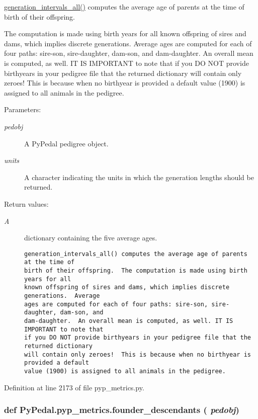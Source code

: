 \hyperlink{namespacePyPedal_1_1pyp__metrics_553d55d2e917b00baf2f02a7cceacd70}{generation\_\-intervals\_\-all()} computes the average age of parents at the time of birth of their offspring. 

The computation is made using birth years for all known offspring of sires and dams, which implies discrete generations. Average ages are computed for each of four paths: sire-son, sire-daughter, dam-son, and dam-daughter. An overall mean is computed, as well. IT IS IMPORTANT to note that if you DO NOT provide birthyears in your pedigree file that the returned dictionary will contain only zeroes! This is because when no birthyear is provided a default value (1900) is assigned to all animals in the pedigree. \begin{Desc}
\item[Parameters:]
\begin{description}
\item[{\em pedobj}]A Py\-Pedal pedigree object. \item[{\em units}]A character indicating the units in which the generation lengths should be returned. \end{description}
\end{Desc}
\begin{Desc}
\item[Return values:]
\begin{description}
\item[{\em A}]dictionary containing the five average ages.

\footnotesize\begin{verbatim}generation_intervals_all() computes the average age of parents at the time of
birth of their offspring.  The computation is made using birth years for all
known offspring of sires and dams, which implies discrete generations.  Average
ages are computed for each of four paths: sire-son, sire-daughter, dam-son, and
dam-daughter.  An overall mean is computed, as well. IT IS IMPORTANT to note that
if you DO NOT provide birthyears in your pedigree file that the returned dictionary
will contain only zeroes!  This is because when no birthyear is provided a default
value (1900) is assigned to all animals in the pedigree.
\end{verbatim}
\normalsize
 \end{description}
\end{Desc}


Definition at line 2173 of file pyp\_\-metrics.py.\hypertarget{namespacePyPedal_1_1pyp__metrics_8bb9c8d14721828c6d87bcd0d4e24658}{
\subsubsection[founder\_\-descendants]{\setlength{\rightskip}{0pt plus 5cm}def Py\-Pedal.pyp\_\-metrics.founder\_\-descendants ( {\em pedobj})}}
\label{namespacePyPedal_1_1pyp__metrics_8bb9c8d14721828c6d87bcd0d4e24658}


